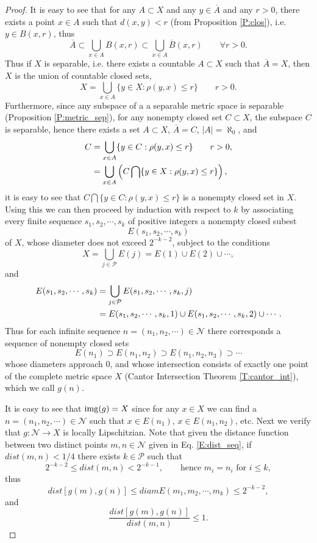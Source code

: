 \begin{proof}
It is easy to see that for any $A\subset X$ and any $y\in \overline{A}$ and any 
$r>0$, there exists a point $x\in A$ such that $d(x,y)<r$ (from Proposition 
\ref{P:clos}), i.e. $y\in B(x,r)$, thus
\[
  \overline{A} \subset \bigcup_{x\in A} B(x,r) 
          \subset \bigcup_{x\in A} \overline{B}(x,r) \qquad \forall r>0.
\]
Thus if $X$ is separable, i.e. there exists a countable $A\subset X$ such that 
$\overline{A}=X$, then $X$ is the union of countable closed sets,
\[
  X = \bigcup_{x\in A} \{y\in X: \rho(y,x)\leq r \} \qquad r>0.
\]
Furthermore, since any subspace of a a separable metric space is separable
(Proposition \ref{P:metric_sep}), for any nonempty closed set $C\subset X$, the 
subspace $C$ is separable, hence there exists a set $A\subset X$, 
$\overline{A}=C$, $|A|=\aleph_0$, and 
\begin{align*}
  C &= \bigcup_{x\in A} \{y\in C: \rho(y,x)\leq r \} \qquad r>0, \notag \\
    &= \bigcup_{x\in A} \left( C\bigcap \{y\in X: \rho(y,x)\leq r \} \right)  
       \notag,
\end{align*}
it is easy to see that $C\bigcap \{y\in C: \rho(y,x)\leq r \}$ is a nonempty
closed set in $X$. 
Using this we can then proceed by induction
with respect to $k$ by associating every finite sequence $s_1,s_2,\cdots,s_k$
of positive integers a nonempty closed subest 
\[
  E(s_1,s_2,\cdots,s_k)
\]
of $X$, whose diameter does not exceed $2^{-k-2}$, subject to the conditions
\[
  X=\bigcup_{j\in\mathcal{P}} E(j) = E(1)\cup E(2)\cup\cdots,
\]
and
\begin{align*}
  E(s_1,s_2,\cdots,s_k) 
    &= \bigcup_{j\in\mathcal{P}} E(s_1,s_2,\cdots,s_k,j) \notag \\
    &= E(s_1,s_2,\cdots,s_k,1) \cup E(s_1,s_2,\cdots,s_k,2) \cup \cdots. \notag
\end{align*}
Thus for each infinite sequence $n=(n_1,n_2,\cdots)\in\mathcal{N}$ there
corresponds a sequence of nonempty closed sets
\[
  E(n_1)\supset E(n_1,n_2) \supset E(n_1,n_2,n_3) \supset \cdots
\]
whose diameters approach $0$, and whose intersection consists of exactly one
point of the complete metric space $X$ (Cantor Intersection Theorem 
\ref{T:cantor_int}), which we call $g(n)$.

It is easy to see that $\operatorname*{img}(g)=X$ since for any $x\in X$ we can find a 
$n=(n_1,n_2,\cdots)\in\mathcal{N}$ such that $x\in E(n_1)$, $x\in E(n_1,n_2)$,
etc. Next we verify that $g:\mathcal{N}\to X$ is locally Lipschitzian. Note that
given the distance function between two distinct points $m,n\in \mathcal{N}$
given in Eq. \ref{E:dist_seq}, if $dist(m,n)<1/4$ there exists 
$k\in \mathcal{P}$ such that 
\[
  2^{-k-2}\leq dist(m,n) < 2^{-k-1}, 
    \qquad \text{hence $m_i=n_i$ for $i\leq k$},
\]
thus
\[
  dist[g(m),g(n)]\leq diam E(m_1,m_2,\cdots,m_k)\leq 2^{-k-2},
\]
and 
\[
  \frac{dist[g(m),g(n)]}{dist(m,n)} \leq 1.
\]
\end{proof}

